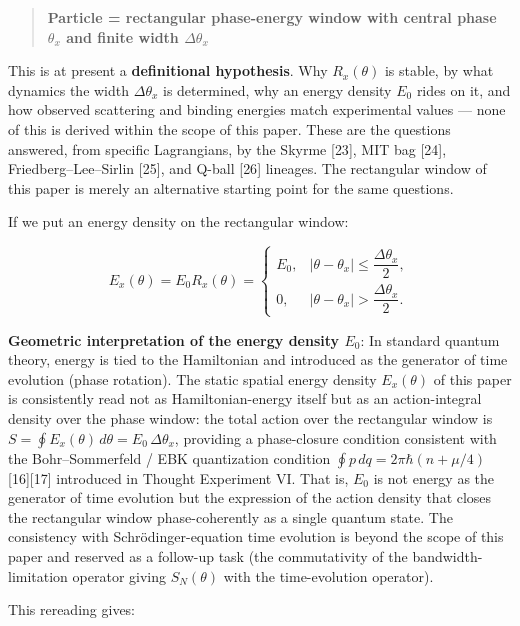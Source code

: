 \documentclass[
]{article}
\newcounter{none} %
\begin{document}
\begin{quote}
\textbf{Particle = rectangular phase-energy window with central phase
\(\theta_x\) and finite width \(\Delta\theta_x\)}
\end{quote}

This is at present a \textbf{definitional hypothesis}. Why
\(R_x(\theta)\) is stable, by what dynamics the width \(\Delta\theta_x\)
is determined, why an energy density \(E_0\) rides on it, and how
observed scattering and binding energies match experimental values ---
none of this is derived within the scope of this paper. These are the
questions answered, from specific Lagrangians, by the Skyrme {[}23{]},
MIT bag {[}24{]}, Friedberg--Lee--Sirlin {[}25{]}, and Q-ball {[}26{]}
lineages. The rectangular window of this paper is merely an alternative
starting point for the same questions.

If we put an energy density on the rectangular window:

\[
E_x(\theta) = E_0 R_x(\theta) = \begin{cases}
E_0, & |\theta - \theta_x| \leq \dfrac{\Delta\theta_x}{2}, \\
0,   & |\theta - \theta_x| > \dfrac{\Delta\theta_x}{2}.
\end{cases}
\]

\textbf{Geometric interpretation of the energy density \(E_0\)}: In
standard quantum theory, energy is tied to the Hamiltonian and
introduced as the generator of time evolution (phase rotation). The
static spatial energy density \(E_x(\theta)\) of this paper is
consistently read not as Hamiltonian-energy itself but as an
action-integral density over the phase window: the total action over the
rectangular window is
\(S = \oint E_x(\theta)\, d\theta = E_0\,\Delta\theta_x\), providing a
phase-closure condition consistent with the Bohr--Sommerfeld / EBK
quantization condition \(\oint p\, dq = 2\pi\hbar(n + \mu/4)\)
{[}16{]}{[}17{]} introduced in Thought Experiment VI. That is, \(E_0\)
is not energy as the generator of time evolution but the expression of
the action density that closes the rectangular window phase-coherently
as a single quantum state. The consistency with Schrödinger-equation
time evolution is beyond the scope of this paper and reserved as a
follow-up task (the commutativity of the bandwidth-limitation operator
giving \(S_N(\theta)\) with the time-evolution operator).

This rereading gives:
\end{document}
